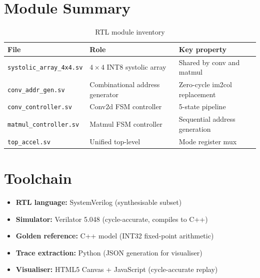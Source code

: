 \documentclass[11pt, letterpaper]{article}
\begin{document}
\section{Module Summary}

\begin{table}[h]
\centering
\caption{RTL module inventory}
\begin{tabular}{lll}
\toprule
\textbf{File} & \textbf{Role} & \textbf{Key property} \\
\midrule
\texttt{systolic\_array\_4x4.sv} & $4\times4$ INT8 systolic array & Shared by conv and matmul \\
\texttt{conv\_addr\_gen.sv}      & Combinational address generator & Zero-cycle im2col replacement \\
\texttt{conv\_controller.sv}     & Conv2d FSM controller & 5-state pipeline \\
\texttt{matmul\_controller.sv}   & Matmul FSM controller & Sequential address generation \\
\texttt{top\_accel.sv}           & Unified top-level & Mode register mux \\
\bottomrule
\end{tabular}
\end{table}

\section{Toolchain}

\begin{itemize}
  \item \textbf{RTL language:} SystemVerilog (synthesisable subset)
  \item \textbf{Simulator:} Verilator 5.048 (cycle-accurate, compiles to C++)
  \item \textbf{Golden reference:} C++ model (INT32 fixed-point arithmetic)
  \item \textbf{Trace extraction:} Python (JSON generation for visualiser)
  \item \textbf{Visualiser:} HTML5 Canvas + JavaScript (cycle-accurate replay)
\end{itemize}

\end{document}
